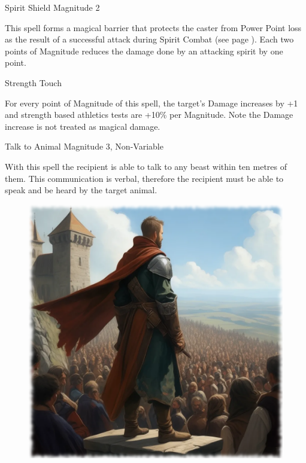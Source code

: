 \begin{rpg-spell}
{Spirit Shield}
{Magnitude 2}

This spell forms a magical barrier that protects the caster from Power Point loss as the result of a successful attack during Spirit Combat (see page \pageref{ssec:spirit-combat}). Each two points of Magnitude reduces the damage done by an attacking spirit by one point.
\end{rpg-spell}


\begin{rpg-spell}
{Strength}
{Touch}

For every point of Magnitude of this spell, the target’s Damage increases by +1 and strength based athletics tests are +10\% per Magnitude. Note the Damage increase is not treated as magical damage.
\end{rpg-spell}


\begin{rpg-spell}
{Talk to Animal}
{Magnitude 3, Non-Variable}

With this spell the recipient is able to talk to any beast within ten metres of them. This communication is verbal, therefore the recipient must be able to speak and be heard by the target animal. 
\end{rpg-spell}

\begin{figure}[h]
\begin{center}
\includegraphics[scale=0.24]{img/ai-images/noble-crowd.png}
\end{center}
\end{figure}

